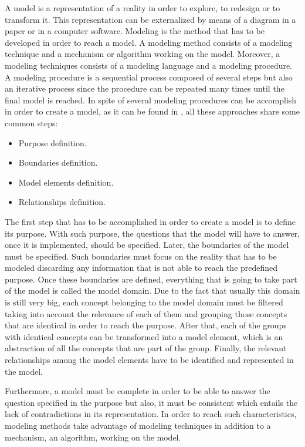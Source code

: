 A model is a representation of a reality in order to explore, to redesign or to transform it. This representation can be externalized by means of a diagram in a paper or in a computer software. Modeling is the method that has to be developed in order to reach a model. A modeling method consists of a modeling technique and a mechanism or algorithm working on the model. Moreover, a modeling techniques consists of a modeling language and a modeling procedure. A modeling procedure is a sequential process composed of several steps but also an iterative process since the procedure can be repeated many times until the final model is reached. In spite of several modeling procedures can be accomplish in order to create a model, as it can be found in \cite{modelwebsite}, all these approaches share some common steps:

\begin{itemize}

\item Purpose definition.
\item Boundaries definition.
\item Model elements definition.
\item Relationships definition.

\end{itemize}

The first step that has to be accomplished in order to create a model is to define its purpose. With such purpose, the questions that the model will have to answer, once it is implemented, should be specified. Later, the boundaries of the model must be specified. Such boundaries must focus on the reality that has to be modeled discarding any information that is not able to reach the predefined purpose. Once these boundaries are defined, everything that is going to take part of the model is called the model domain. Due to the fact that usually this domain is still very big, each concept belonging to the model domain must be filtered taking into account the relevance of each of them and grouping those concepts that are identical in order to reach the purpose. After that, each of the groups with identical concepts can be transformed into a model element, which is an abstraction of all the concepts that are part of the group. Finally, the relevant relationships among the model elements have to be identified and represented in the model.

Furthermore, a model must be complete in order to be able to answer the question specified in the purpose but also, it must be consistent which entails the lack of contradictions in its representation. In order to reach such characteristics, modeling methods take advantage of modeling techniques in addition to a mechanism, an algorithm, working on the model.

